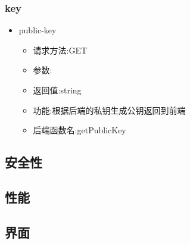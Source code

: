 \subsubsection*{key}
\begin{itemize}
  \item public-key
\begin{itemize}
    \item 请求方法:GET
    \item 参数:
    \item 返回值:string
    \item 功能:根据后端的私钥生成公钥返回到前端
    \item 后端函数名:getPublicKey
\end{itemize}
\end{itemize}


\subsection{安全性}






\subsection{性能}
\subsection{界面}
